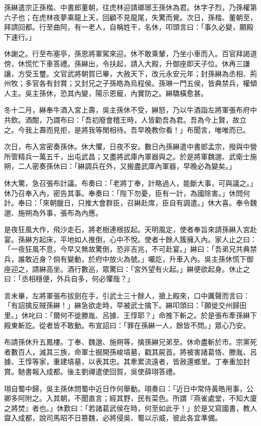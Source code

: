 孫綝遣宗正孫楷、中書郎董朝，往虎林迎請瑯琊王孫休為君。休字子烈，乃孫權第六子也；在虎林夜夢乘龍上天，回顧不見龍尾，失驚而覺。次日，孫楷、董朝至，拜請回都。行至曲阿，有一老人，自稱姓干，名休，叩頭言曰：「事久必變，願殿下速行。」

休謝之。行至布塞亭，孫恩將軍駕來迎。休不敢乘輦，乃坐小車而入。百官拜謁道傍，休慌忙下車答禮。孫綝出，令扶起，請入大殿，升御座即天子位。休再三謙讓，方受玉璽。文官武將朝賀已畢，大赦天下，改元永安元年；封孫綝為丞相、荊州牧；多官各有封賞；又封兄之子孫皓為烏程侯。孫琳一門五侯，皆典禁兵，權傾人主。吳主孫休，恐其內變，陽示恩寵，內實防之。綝驕橫愈甚。

冬十二月，綝奉牛酒入宮上壽，吳主孫休不受，綝怒，乃以牛酒詣左將軍張布府中共飲。酒酣，乃謂布曰：「吾初廢會稽王時，人皆勸吾為君。吾為今上賢，故立之。今我上壽而見拒，是將我等閒相待。吾早晚教你看！」布聞言，唯唯而已。

次日，布入宮密奏孫休。休大懼，日夜不安。數日內孫綝遣中書郎孟宗，撥與中營所管精兵一萬五千，出屯武昌；又盡將武庫內軍器與之。於是將軍魏邈、武衛士施朔，二人密奏孫休曰：「綝調兵在外，又搬盡武庫內軍器，早晚必為變矣。」

休大驚，急召張布計議。布奏曰：「老將丁奉，計略過人，能斷大事，可與議之。」休乃召奉入內，密告其事。奉奏曰：「陛下勿憂，臣有一計，為國除害。」休問何計。奉曰：「來朝臘日，只推大會群臣，召綝赴席，臣自有調遣。」休大喜。奉令魏邈、施朔為外事，張布為內應。

是夜狂風大作，飛沙走石，將老樹連根拔起。天明風定，使者奉旨來請孫綝入宮赴宴。孫綝方起床，平地如人推倒，心中不悅。使者十餘人簇擁入內。家人止之曰：「一夜狂風不息，今早又無故驚倒，恐非吉兆，不可赴宴。」綝曰：「吾弟兄共典禁兵，誰敢近身？倘有變動，於府中放火為號。」囑訖，升車入內。吳主孫休慌下御座迎之，請綝高坐。酒行數巡，眾驚曰：「宮外望有火起。」綝便欲起身。休止之曰：「丞相穩便，外兵自多，何必懼哉？」

言未畢，左將軍張布拔劍在手，引武士三十餘人，搶上殿來，口中厲聲而言曰：「有詔擒反賊孫綝！」綝急欲走時，早被武士擒下。綝叩頭曰：「願徙交州歸田里。」休叱曰：「爾何不徙滕胤、呂據、王惇耶？」命推下斬之。於是張布牽孫綝下殿東斬訖。從者皆不敢動。布宣詔曰：「罪在孫綝一人，餘皆不問。」眾心乃安。

布請孫休升五鳳樓。丁奉、魏邈、施朔等，擒孫綝兄弟至。休命盡斬於市。宗黨死者數百人，滅其三族，命軍士掘開孫峻墳墓，戳其屍首。將被害諸葛恪、滕胤、呂據、王惇等家，重建墳墓，以表其忠。其牽累流遠者，皆赦還鄉里。丁奉重加封賞。馳書報入成都。後主劉禪遣使回賀，吳使薛珝答禮。

珝自蜀中歸，吳主孫休問蜀中近日作何舉動。珝奏曰：「近日中常侍黃皓用事，公卿多阿附之。入其朝，不聞直言；經其野，民有菜色。所謂『燕雀處堂，不知大廈之將焚』者也。」休歎曰：「若諸葛武侯在時，何至如此乎！」於是又寫國書，教人齍入成都，說司馬昭不日篡魏，必將侵吳、蜀以示威，彼此各宜準備。

